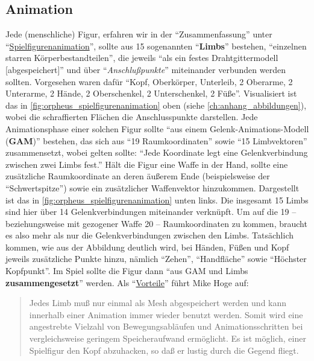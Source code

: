 \documentclass[a5paper,pagesize,numbers=noenddot]{scrbook}
\begin{document}
\subsection{Animation}\label{sec:orpheus_darstellung_animation}
Jede (menschliche) Figur, erfahren wir in der \enquote{Zusammenfassung} unter \enquote{\uline{Spiel\-figurenanimation}}, sollte aus 15 sogenannten \enquote{\textbf{Limbs}} bestehen, \enquote{einzelnen starren Körperbestandteilen}, die jeweils \enquote{als ein festes Drahtgittermodell [abgespeichert]} und über \enquote{\textit{Anschlußpunkte}} miteinander verbunden werden sollten.
Vorgesehen waren dafür \enquote{Kopf, Oberkörper, Unterleib, 2 Oberarme, 2 Unterarme, 2 Hände, 2 Oberschenkel, 2 Unterschenkel, 2 Füße}.\autocite[S.~1]{orpheus_zusammenfassung_1996}
Visualisiert ist das in \autoref{fig:orpheus_spielfigurenanimation} oben (siehe \autoref{ch:anhang_abbildungen}), wobei die schraffierten Flächen die Anschlusspunkte darstellen.
Jede Animationsphase einer solchen Figur sollte \enquote{aus einem Gelenk-Animations-Modell (\textbf{GAM})} bestehen, das sich aus \enquote{19 Raumkoordinaten} sowie \enquote{15 Limbvektoren} zusammensetzt, wobei gelten sollte:
\enquote{Jede Koordinate legt eine Gelenkverbindung zwischen zwei Limbs fest.}\autocite[S.~1]{orpheus_zusammenfassung_1996}
Hält die Figur eine Waffe in der Hand, sollte eine zusätzliche Raumkoordinate an deren äußerem Ende (beispielsweise der \enquote{Schwertspitze}) sowie ein zusätzlicher Waffenvektor hinzukommen.\autocite[S.~1]{orpheus_zusammenfassung_1996}
Dargestellt ist das in \autoref{fig:orpheus_spielfigurenanimation} unten links.
Die insgesamt 15 Limbs sind hier über 14 Gelenkverbindungen miteinander verknüpft.
Um auf die 19 -- beziehungsweise mit gezogener Waffe 20 -- Raumkoordinaten zu kommen, braucht es also mehr als nur die Gelenkverbindungen zwischen den Limbs.
Tatsächlich kommen, wie aus der Abbildung deutlich wird, bei Händen, Füßen und Kopf jeweils zusätzliche Punkte hinzu, nämlich \enquote{Zehen}, \enquote{Handfläche} sowie \enquote{Höchster Kopfpunkt}.\autocite[S.~4]{orpheus_zusammenfassung_1996}
Im Spiel sollte die Figur dann \enquote{aus GAM und Limbs \textbf{zusammengesetzt}} werden.\autocite[S.~1]{orpheus_zusammenfassung_1996}
Als \enquote{\uline{Vorteile}} führt Mike Hoge auf:

\begin{quote}
   Jedes Limb muß nur einmal als Mesh abgespeichert werden und kann innerhalb einer Animation immer wieder benutzt werden.
   Somit wird eine angestrebte Vielzahl von Bewegungsabläufen und Animationsschritten bei vergleichsweise geringem Speicheraufwand ermöglicht.
   Es ist möglich, einer Spielfigur den Kopf abzuhacken, so daß er lustig durch die Gegend fliegt.\autocite[S.~1]{orpheus_zusammenfassung_1996}
\end{quote}
\end{document}
